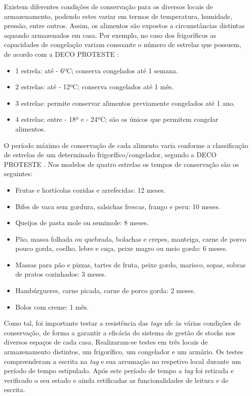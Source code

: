 Existem diferentes condições de conservação para os diversos locais de armazenamento, podendo estes variar em termos de temperatura, humidade, pressão, entre outros. Assim, os alimentos são expostos a circunstâncias distintas aquando armazenados em casa. Por exemplo, no caso dos frigoríficos as capacidades de congelação variam consoante o número de estrelas que possuem, de acordo com a DECO PROTESTE \cite{deco:fridgeStarsClassification}:

\begin{itemize}
    \item 1 estrela: até - 6ºC; conserva congelados até 1 semana.
    \item 2 estrelas: até - 12ºC; conserva congelados até 1 mês.
    \item 3 estrelas: permite conservar alimentos previamente congelados até 1 ano.
    \item 4 estrelas: entre - 18º e - 24ºC; são os únicos que permitem congelar alimentos.
\end{itemize}

O período máximo de conservação de cada alimento varia conforme a classificação de estrelas de um determinado frigorífico/congelador, segundo a DECO PROTESTE \cite{deco:conservationTimeByProduct}. Nos modelos de quatro estrelas os tempos de conservação são os seguintes: 
\begin{itemize}
    \item Frutas e hortícolas cozidas e arrefecidas: 12 meses.
    \item Bifes de vaca sem gordura, salsichas frescas, frango e peru: 10 meses.
    \item Queijos de pasta mole ou semimole: 8 meses.
    \item Pão, massa folhada ou quebrada, bolachas e crepes, manteiga, carne de porco pouco gorda, coelho, lebre e caça, peixe magro ou meio gordo: 6 meses.
    \item Massas para pão e pizzas, tartes de fruta, peixe gordo, marisco, sopas, sobras de pratos cozinhados: 3 meses.
    \item Hambúrgueres, carne picada, carne de porco gorda: 2 meses.
    \item Bolos com creme: 1 mês.
\end{itemize}

Como tal, foi importante testar a resistência das \textit{tags} \acrshort{nfc} às várias condições de conservação, de forma a garantir a eficácia do sistema de gestão de stocks nos diversos espaços de cada casa. Realizaram-se testes em três locais de armazenamento distintos, um frigorífico, um congelador e um armário. Os testes compreenderam a escrita na \textit{tag} e sua arrumação no respetivo local durante um período de tempo estipulado. Após este período de tempo a \textit{tag} foi retirada e verificado o seu estado e ainda retificadas as funcionalidades de leitura e de escrita.

